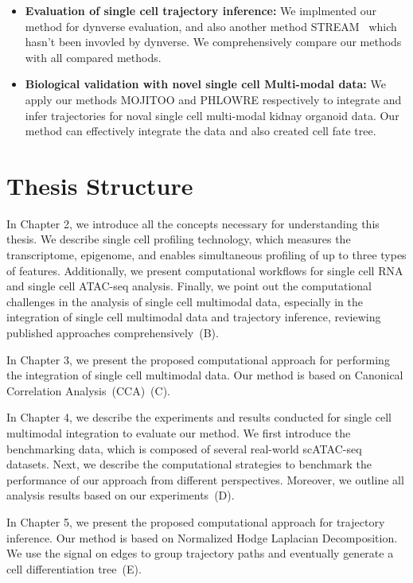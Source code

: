 \begin{itemize}
	\item \textbf{Evaluation of single cell trajectory inference:} We implmented our method for dynverse evaluation, and also another method STREAM~\citep{chen2019stream} which hasn't been invovled by dynverse. We comprehensively compare our methods with all compared methods.

	\item \textbf{Biological validation with novel single cell Multi-modal data:} We apply our methods MOJITOO and PHLOWRE respectively to integrate and infer trajectories for noval single cell multi-modal kidnay organoid data. Our method can effectively integrate the data and also created cell fate tree.
\end{itemize}


\section{Thesis Structure}
\label{introduction:sec3.structure}
In Chapter 2, we introduce all the concepts necessary for understanding this thesis. We describe single cell profiling technology, which measures the transcriptome, epigenome, and enables simultaneous profiling of up to three types of features. Additionally, we present computational workflows for single cell RNA and single cell ATAC-seq analysis. Finally, we point out the computational challenges in the analysis of single cell multimodal data, especially in the integration of single cell multimodal data and trajectory inference, reviewing published approaches comprehensively~(B).

In Chapter 3, we present the proposed computational approach for performing the integration of single cell multimodal data. Our method is based on Canonical Correlation Analysis~(CCA)~(C).

In Chapter 4, we describe the experiments and results conducted for single cell multimodal integration to evaluate our method. We first introduce the benchmarking data, which is composed of several real-world scATAC-seq datasets. Next, we describe the computational strategies to benchmark the performance of our approach from different perspectives. Moreover, we outline all analysis results based on our experiments~(D).

In Chapter 5, we present the proposed computational approach for trajectory inference. Our method is based on Normalized Hodge Laplacian Decomposition. We use the signal on edges to group trajectory paths and eventually generate a cell differentiation tree~(E).

